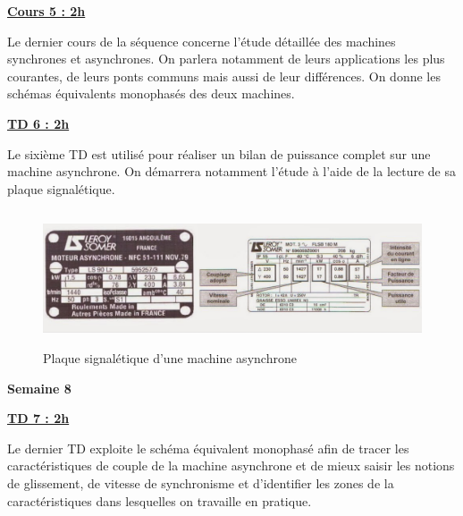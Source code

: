 \documentclass[12pt]{article}
\begin{document}
\begin{adjustwidth}{5em}{0pt}
\color{blue}
\hspace{20pt}\textbf{\underline{Cours 5 : 2h}}\par
\vspace{10pt}
\color{black}

Le dernier cours de la séquence concerne l'étude détaillée des machines synchrones et asynchrones. On parlera notamment de leurs applications les plus courantes, de leurs ponts communs mais aussi de leur différences. On donne les schémas équivalents monophasés des deux machines. 


\color{blue}
\hspace{20pt}\textbf{\underline{TD 6 : 2h}}\par
\vspace{10pt}
\color{black}

Le sixième TD est utilisé pour réaliser un bilan de puissance complet sur une machine asynchrone. On démarrera notamment l'étude à l'aide de la lecture de sa plaque signalétique.

\begin{figure}[!h]
\centering
\includegraphics[width=12cm,height=4cm,trim=0cm 0cm 0cm 0cm, clip=true]{Images_Rapport/plaque}
\caption{Plaque signalétique d'une machine asynchrone}
\end{figure} 



\end{adjustwidth}

\vspace{10pt}

\color{red}
\textbf{Semaine 8}

\begin{adjustwidth}{5em}{0pt}



\color{blue}
\hspace{20pt}\textbf{\underline{TD 7 : 2h}}\par
\vspace{10pt}
\color{black}

Le dernier TD exploite le schéma équivalent monophasé afin de tracer les caractéristiques de couple de la machine asynchrone et de mieux saisir les notions de glissement, de vitesse de synchronisme et d'identifier les zones de la caractéristiques dans lesquelles on travaille en pratique.



\end{adjustwidth}
\end{document}
